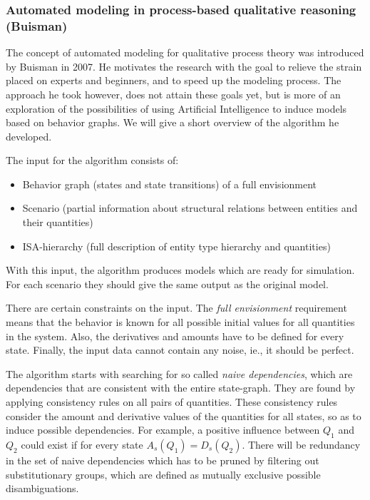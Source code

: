 \documentclass{article} %
\begin{document}
\subsubsection{Automated modeling in process-based qualitative reasoning
(Buisman)}
\label{sec:litrev_am_buisman}
The concept of automated modeling for qualitative process theory was
introduced by Buisman \cite{buisman} in 2007. He motivates the research with
the goal to relieve the strain placed on experts and beginners, and to speed
up the modeling process. The approach he took however, does not attain these
goals yet, but is more of an exploration of the possibilities of using
Artificial Intelligence to induce models based on behavior graphs. We will
give a short overview of the algorithm he developed.

The input for the algorithm consists of:

\begin{itemize}

\item Behavior graph (states and state transitions) of a full envisionment

\item Scenario (partial information about structural relations between entities and their quantities)

\item ISA-hierarchy (full description of entity type hierarchy and quantities)

\end{itemize}

With this input, the algorithm produces models which are ready for simulation.
For each scenario they should give the same output as the original model.

There are certain constraints on the input. The \emph{full envisionment}
requirement means that the behavior is known for all possible initial values
for all quantities in the system. Also, the derivatives and amounts have to be
defined for every state. Finally, the input data cannot contain any noise,
ie., it should be perfect.

The algorithm starts with searching for so called \emph{naive dependencies},
which are dependencies that are consistent with the entire state-graph. They
are found by applying consistency rules on all pairs of quantities. These
consistency rules consider the amount and derivative values of the quantities
for all states, so as to induce possible dependencies. For example, a positive
influence between $Q_1$ and $Q_2$ could exist if for every state $A_s(Q_1) =
D_s(Q_2)$.  There will be redundancy in the set of naive dependencies which
has to be pruned by filtering out substitutionary groups, which are defined as
mutually exclusive possible disambiguations. 
\end{document}
